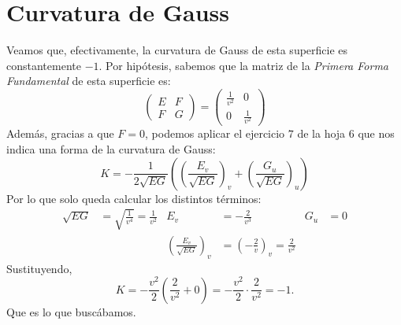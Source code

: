\section{Curvatura de Gauss}
Veamos que, efectivamente, la curvatura de Gauss de esta superficie es
constantemente $-1$. Por hipótesis, sabemos que la matriz de la \textit{Primera
Forma Fundamental} de esta superficie es:
\[
    \begin{pmatrix} E & F\\ F & G \end{pmatrix} = \begin{pmatrix} \frac{1}{v^2} & 0\\
    0 & \frac{1}{v^2}\end{pmatrix}
\]
Además, gracias a que $F = 0$, podemos aplicar el ejercicio $7$ de la hoja $6$
que nos indica una forma de la curvatura de Gauss:
\[
K = -\frac{1}{2 \sqrt{EG}}\left( \left( \frac{E_v}{\sqrt{EG}} \right)_v + \left(
\frac{G_u}{\sqrt{EG}}\right)_u \right)
\]
Por lo que solo queda calcular los distintos términos:
\begin{align*}
    \sqrt{EG} &= \sqrt{\frac{1}{v^4}} = \frac{1}{v^2} & E_v &= -\frac{2}{v^3} &
    G_u &= 0\\
        & & \left( \frac{E_v}{\sqrt{EG}} \right)_v &= \left( -\frac{2}{v}
        \right)_v = \frac{2}{v^2}
\end{align*}
Sustituyendo,
\[
K = -\frac{v^2}{2} \left( \frac{2}{v^2} + 0 \right) = - \frac{v^2}{2} \cdot
\frac{2}{v^2} = -1.
\]
Que es lo que buscábamos.
